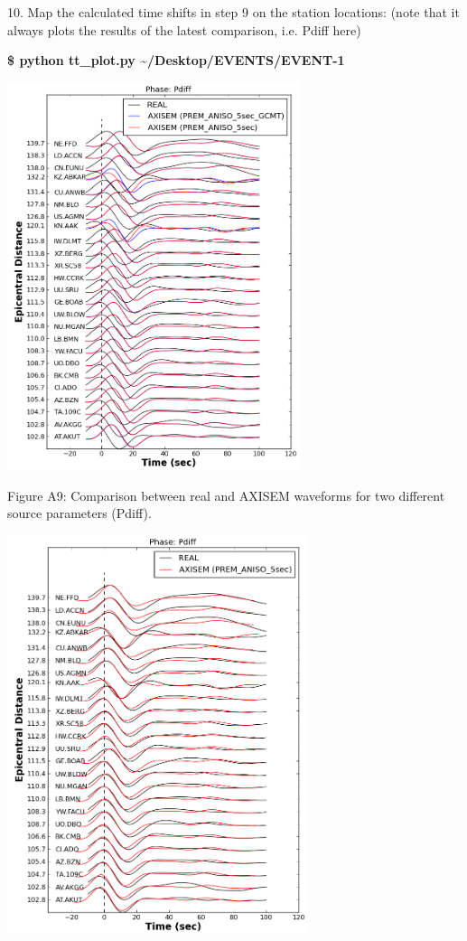 \documentclass{article}
\begin{document}
\vspace{13pt}
10. Map the calculated time shifts in step 9 on the station locations: (note that 
it always plots the results of the latest comparison, i.e. Pdiff here) 

\textbf{\$ python tt\_plot.py \textasciitilde{}/Desktop/EVENTS/EVENT-1}

\begin{center}
\includegraphics[width=242pt, height=322pt, keepaspectratio=true]{AXISEMTutorial-fig015.png}

{\small{}Figure A9: Comparison between real and AXISEM waveforms for two different 
source parameters (Pdiff).}

\includegraphics[width=249pt, height=331pt, keepaspectratio=true]{AXISEMTutorial-fig016.png}


\end{center}
\end{document}
